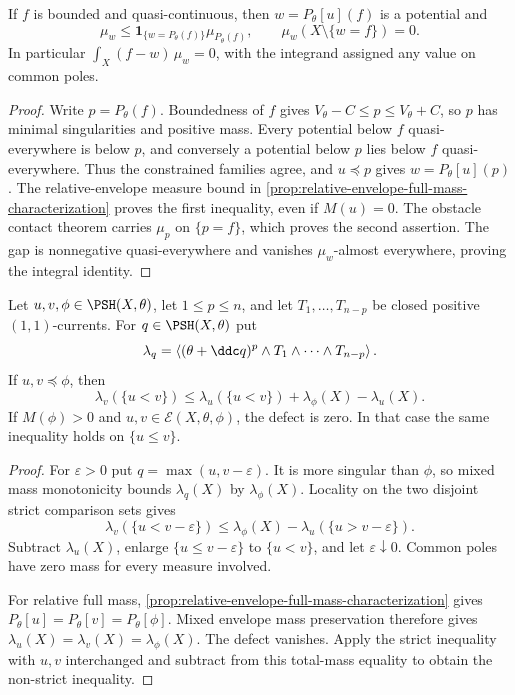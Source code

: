 \begin{proposition}\label{prop:singularity-obstacle-contact}
If $f$ is bounded and quasi-continuous, then $w=P_\theta[u](f)$ is a potential and
\[
 \mu_w\leq\mathbf1_{\{w=P_\theta(f)\}}\mu_{P_\theta(f)},
                \qquad \mu_w(X\setminus\{w=f\})=0.
\]
In particular $\int_X(f-w)\,\mu_w=0$, with the integrand assigned any value on common poles.
\end{proposition}
\begin{proof}
Write $p=P_\theta(f)$. Boundedness of $f$ gives $V_\theta-C\leq p\leq V_\theta+C$, so $p$ has minimal singularities and positive mass. Every potential below $f$ quasi-everywhere is below $p$, and conversely a potential below $p$ lies below $f$ quasi-everywhere. Thus the constrained families agree, and $u\preceq p$ gives
$w=P_\theta[u](p)$. The relative-envelope measure bound in \cref{prop:relative-envelope-full-mass-characterization} proves the first inequality, even if $M(u)=0$. The obstacle contact theorem carries $\mu_p$ on $\{p=f\}$, which proves the second assertion. The gap is nonnegative quasi-everywhere and vanishes $\mu_w$-almost everywhere, proving the integral identity.
\end{proof}

\begin{proposition}\label{prop:relative-mixed-comparison}
Let $u,v,\phi\in\PSH(X,\theta)$, let $1\leq p\leq n$, and let $T_1,\ldots,T_{n-p}$ be closed positive $(1,1)$-currents. For $q\in\PSH(X,\theta)$ put
\[
 \lambda_q=\left\langle(\theta+\ddc q)^p
                           \wedge T_1\wedge\cdots\wedge T_{n-p}\right\rangle.
\]
If $u,v\preceq\phi$, then
\[
 \lambda_v(\{u<v\})\leq\lambda_u(\{u<v\})
                                +\lambda_\phi(X)-\lambda_u(X).
\]
If $M(\phi)>0$ and $u,v\in\mathcal E(X,\theta,\phi)$, the defect is zero. In that case the same inequality holds on $\{u\leq v\}$.
\end{proposition}
\begin{proof}
For $\varepsilon>0$ put $q=\max(u,v-\varepsilon)$. It is more singular than $\phi$, so mixed mass monotonicity bounds $\lambda_q(X)$ by $\lambda_\phi(X)$. Locality on the two disjoint strict comparison sets gives
\[
 \lambda_v(\{u<v-\varepsilon\})
            \leq\lambda_\phi(X)-\lambda_u(\{u>v-\varepsilon\}).
\]
Subtract $\lambda_u(X)$, enlarge $\{u\leq v-\varepsilon\}$ to $\{u<v\}$, and let $\varepsilon\downarrow0$. Common poles have zero mass for every measure involved.

For relative full mass, \cref{prop:relative-envelope-full-mass-characterization} gives $P_\theta[u]=P_\theta[v]=P_\theta[\phi]$. Mixed envelope mass preservation therefore gives $\lambda_u(X)=\lambda_v(X)=\lambda_\phi(X)$. The defect vanishes. Apply the strict inequality with $u,v$ interchanged and subtract from this total-mass equality to obtain the non-strict inequality.
\end{proof}

